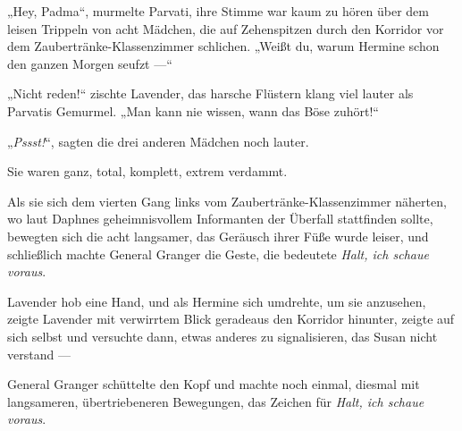 „Hey, Padma“, murmelte Parvati, ihre Stimme war kaum zu hören über dem leisen Trippeln von acht Mädchen, die auf Zehenspitzen durch den Korridor vor dem Zaubertränke-Klassenzimmer schlichen.
„Weißt du, warum Hermine schon den ganzen Morgen seufzt —“

„Nicht reden!“ zischte Lavender, das harsche Flüstern klang viel lauter als Parvatis Gemurmel.
„Man kann nie wissen, wann das Böse zuhört!“

„\emph{Pssst!}“, sagten die drei anderen Mädchen noch lauter.

Sie waren ganz, total, komplett, extrem verdammt.

Als sie sich dem vierten Gang links vom Zaubertränke-Klassenzimmer näherten, wo laut Daphnes geheimnisvollem Informanten der Überfall stattfinden sollte, bewegten sich die acht langsamer, das Geräusch ihrer Füße wurde leiser, und schließlich machte General Granger die Geste, die bedeutete \emph{Halt, ich schaue voraus}.

Lavender hob eine Hand, und als Hermine sich umdrehte, um sie anzusehen, zeigte Lavender mit verwirrtem Blick geradeaus den Korridor hinunter, zeigte auf sich selbst und versuchte dann, etwas anderes zu signalisieren, das Susan nicht verstand —

General Granger schüttelte den Kopf und machte noch einmal, diesmal mit langsameren, übertriebeneren Bewegungen, das Zeichen für \emph{Halt, ich schaue voraus}.

